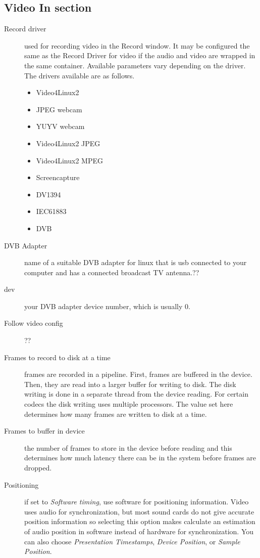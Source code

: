 \subsection{Video In section}%
\label{sub:video_in_section}

\begin{description}
    \item[Record driver] used for recording video in the Record window. It may be configured the same as the Record Driver for video if the audio and video are wrapped in the same container. Available parameters vary depending on the driver. The drivers available are as follows.
    \begin{itemize}
        \item Video4Linux2
        \item JPEG webcam
        \item YUYV webcam
        \item Video4Linux2 JPEG
        \item Video4Linux2 MPEG
        \item Screencapture
        \item DV1394
        \item IEC61883
        \item DVB
    \end{itemize}
    \item[DVB Adapter] name of a suitable DVB adapter for linux that is usb connected to your computer and has a connected broadcast TV antenna.??
    \item[dev] your DVB adapter device number, which is usually 0.
    \item[Follow video config] ??
    \item[Frames to record to disk at a time] frames are recorded in a pipeline. First, frames are buffered in the device. Then, they are read into a larger buffer for writing to disk. The disk writing is done in a separate thread from the device reading. For certain codecs the disk writing uses multiple processors. The value set here determines how many frames are written to disk at a time.
    \item[Frames to buffer in device ] the number of frames to store in the device before reading and this determines how much latency there can be in the system before frames are dropped.
    \item[Positioning] if set to \textit{Software timing}, use software for positioning information. Video uses audio for synchronization, but most sound cards do not give accurate position information so selecting this option makes \CGG{} calculate an estimation of audio position in software instead of hardware for synchronization.  You can also choose \textit{Presentation Timestamps}, \textit{Device Position}, or \textit{Sample Position}.

\end{description}
